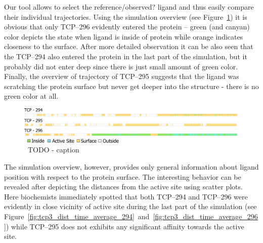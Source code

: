 \documentclass[twocolumn]{bmcart}%
\begin{document}
Our tool allows to select the reference{\color{red}/observed?} ligand and thus easily compare their individual trajectories.
Using the simulation overview (see Figure~\ref{fig:tcp3_overview}) it is obvious that only TCP--296 evidently entered the protein -- green (and canyan) color depicts the state when ligand is inside of protein while orange indicates closeness to the surface. 
After more detailed observation it can be also seen that the TCP--294 also entered the protein in the last part of the simulation, but it probably did not enter deep since there is just small amount of green color. 
Finally, the overview of trajectory of TCP--295 suggests that the ligand was scratching the protein surface but never get deeper into the structure - there is no green color at all.


\begin{figure}[htb]
	\centering
	\includegraphics[width=0.95\linewidth]{img/tcp3_overview.pdf}
  \caption{
  \label{fig:tcp3_overview}
  ~TODO - caption
  }
\end{figure}   

The simulation overview, however, provides only general information about ligand position with respect to the protein surface.
The interesting behavior can be revealed after depicting the distances from the active site using scatter plots.
Here biochemists immediately spotted that both TCP--294 and TCP--296 were evidently in close vicinity of active site during the last part of the simulation (see Figure~\ref{fig:tcp3_dist_time_average_294}~and~\ref{fig:tcp3_dist_time_average_296}) while TCP--295 does not exhibits any significant affinity towards the active site.
\end{document}
